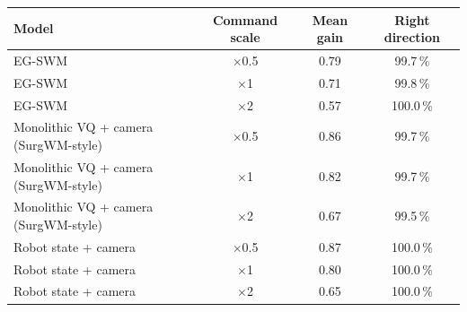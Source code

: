 \begin{tabular}{lccc}
\toprule
Model & Command scale & Mean gain & Right direction \\
\midrule
EG-SWM & $\times$0.5 & 0.79 & 99.7\,\% \\
EG-SWM & $\times$1 & 0.71 & 99.8\,\% \\
EG-SWM & $\times$2 & 0.57 & 100.0\,\% \\
Monolithic VQ + camera (SurgWM-style) & $\times$0.5 & 0.86 & 99.7\,\% \\
Monolithic VQ + camera (SurgWM-style) & $\times$1 & 0.82 & 99.7\,\% \\
Monolithic VQ + camera (SurgWM-style) & $\times$2 & 0.67 & 99.5\,\% \\
Robot state + camera & $\times$0.5 & 0.87 & 100.0\,\% \\
Robot state + camera & $\times$1 & 0.80 & 100.0\,\% \\
Robot state + camera & $\times$2 & 0.65 & 100.0\,\% \\
\bottomrule
\end{tabular}
